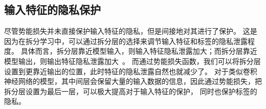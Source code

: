 \subsection{输入特征的隐私保护}
尽管势能损失并未直接保护输入特征的隐私，但是间接地对其进行了保护。
%
这是因为在拆分学习中，可以通过拆分层的选择来调节输入特征和标签的隐私泄露程度。
具体而言，拆分层靠近模型输入，则输入特征隐私泄露加大；而拆分层靠近模型输出，则输出特征隐私泄露加大~\cite{abuadbba2020can_split}。
%
而通过势能损失函数，我们可以将拆分层设置到更靠近输出的位置，此时特征的隐私泄露自然也就减少了。
%
对于类似卷积神经网络的模型，其中间层会保留大量的输入数据的信息，因此通过势能损失，把拆分层设置为最后一层，可以极大提高对于输入特征的保护，
同时也保护标签的隐私。
%